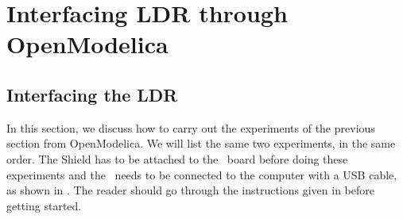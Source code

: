\section{Interfacing LDR through OpenModelica}
\subsection{Interfacing the LDR}
In this section, we discuss how to carry out the experiments of the
previous section from OpenModelica.  We will list the same two experiments,
in the same order.  The Shield has to be attached to the \arduino\ board
before doing these experiments and the \arduino\ needs to be connected to the computer 
with a USB cable, as shown in .
The reader should go through the instructions given in
 before getting started.

